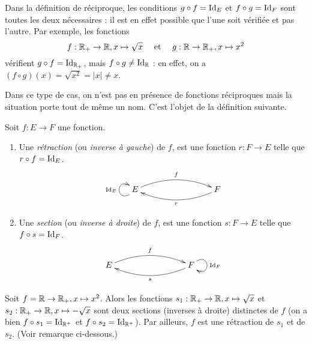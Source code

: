 \begin{attention}
Dans la définition de réciproque, les conditions $g\circ f = \operatorname{Id}_E$ et  $f\circ g = \operatorname{Id}_F$ sont toutes les deux nécessaires : il est en effet possible que l'une soit vérifiée et pas l'autre. Par exemple, les fonctions 
\[
f : \mathbb{R}_+\to \mathbb{R}, x\mapsto \sqrt x
\quad \text{ et }\quad
g : \mathbb{R}\to \mathbb{R}_+, x\mapsto x^2
\]
vérifient $g\circ f=\operatorname{Id}_{\mathbb{R}_+}$, mais $f\circ g \neq \operatorname{Id}_{\mathbb{R}}$ : en effet, on a $(f\circ g)(x)=\sqrt{x^2}=|x|\neq x$.

Dans ce type de cas, on n'est pas en présence de fonctions réciproques mais la situation porte tout de même un nom. C'est l'objet de la définition suivante.
\end{attention}

\begin{definition}
Soit $f : E\to F$ une fonction.
\begin{enumerate}
\item Une \emph{rétraction} (ou \emph{inverse à gauche}) de $f$, est une fonction $r:F\to E$ telle que $r\circ f = \operatorname{Id}_E$.
\[
\xymatrix{
 E \ar@(dl,ul)^{\Id_E} \ar@/^1pc/[rrr]^{f}
& & & 
\ar@/^1pc/[lll]^{r}  F 
}
\]
\item Une \emph{section} (ou \emph{inverse à droite}) de $f$, est une fonction $s:F\to E$ telle que $f \circ s = \operatorname{Id}_F$.
\[
\xymatrix{
 E  \ar@/^1pc/[rrr]^{f} 
& & & 
\ar@/^1pc/[lll]^{s}  F \ar@(ur,dr)^{\Id_F}
}
\]
\end{enumerate}
\end{definition}

\begin{exemple}
Soit $f = \mathbb{R}\to \mathbb{R}_+, x\mapsto x^2$. Alors les fonctions $s_1 : \mathbb{R}_+\to \mathbb{R}, x\mapsto \sqrt x$ et $s_2 : \mathbb{R}_+\to \mathbb{R}, x\mapsto -\sqrt x$ sont deux sections (inverses à droite) distinctes de $f$ (on a bien $f\circ s_1 = \operatorname{Id}_{\mathbb{R}^+}$ et $f\circ s_2 = \operatorname{Id}_{\mathbb{R}^+}$). 
Par ailleurs, $f$ est une rétraction de $s_1$ et de $s_2$. (Voir remarque ci-dessous.)
\end{exemple}

